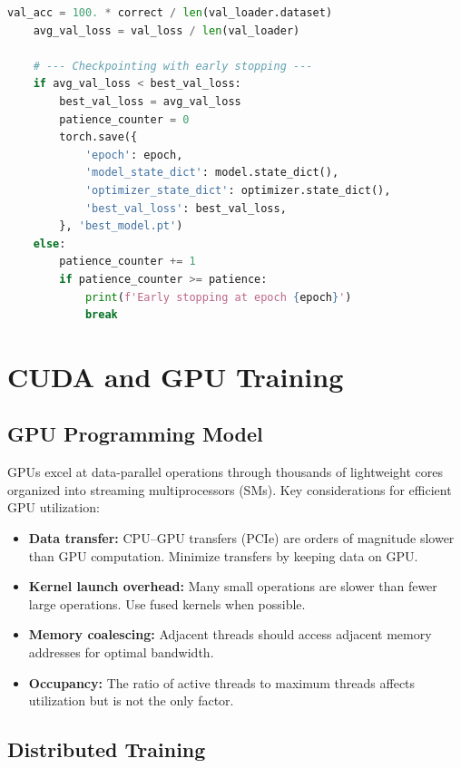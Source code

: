 \begin{code}
\begin{lstlisting}[language=python]
    val_acc = 100. * correct / len(val_loader.dataset)
    avg_val_loss = val_loss / len(val_loader)
    
    # --- Checkpointing with early stopping ---
    if avg_val_loss < best_val_loss:
        best_val_loss = avg_val_loss
        patience_counter = 0
        torch.save({
            'epoch': epoch,
            'model_state_dict': model.state_dict(),
            'optimizer_state_dict': optimizer.state_dict(),
            'best_val_loss': best_val_loss,
        }, 'best_model.pt')
    else:
        patience_counter += 1
        if patience_counter >= patience:
            print(f'Early stopping at epoch {epoch}')
            break
\end{lstlisting}
\end{code}

\section{CUDA and GPU Training}

\subsection{GPU Programming Model}

GPUs excel at data-parallel operations through thousands of lightweight cores organized into streaming multiprocessors (SMs). Key considerations for efficient GPU utilization:

\begin{itemize}
    \item \textbf{Data transfer:} CPU--GPU transfers (PCIe) are orders of magnitude slower than GPU computation. Minimize transfers by keeping data on GPU.
    \item \textbf{Kernel launch overhead:} Many small operations are slower than fewer large operations. Use fused kernels when possible.
    \item \textbf{Memory coalescing:} Adjacent threads should access adjacent memory addresses for optimal bandwidth.
    \item \textbf{Occupancy:} The ratio of active threads to maximum threads affects utilization but is not the only factor.
\end{itemize}

\subsection{Distributed Training}

